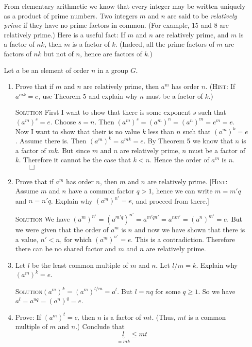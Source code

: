 \documentclass[twoside]{amsart}
\newcommand{\solution}{\textsc{Solution}\xspace}
\newcommand{\blank}{\vspace{5pt}}
\newcommand{\itm}{\blank\item}
\newcommand{\sol}{\blank\noindent\solution}
\begin{document}
\begin{enumerate}[A.]
   \noindent From elementary arithmetic we know that every integer may be
   written uniquely as a product of prime numbers. Two integers $m$ and $n$
   are said to be \emph{relatively prime} if they have no prime factors
   in common. (For example, 15 and 8 are relatively prime.) Here is a 
   useful fact: If $m$ and $n$ are relatively prime, and $m$ is a factor
   of $nk$, then $m$ is a factor of $k$. (Indeed, all the prime factors of 
   $m$ are factors of $nk$ but not of $n$, hence are factors of $k$.)

   \indent Let $a$ be an element of order $n$ in a group $G$.

   \begin{enumerate}[1)]
      \itm Prove that if $m$ and $n$ are relatively prime, then $a^m$ has
      order $n$. (\textsc{Hint}: If $a^{mk} = e$, use Theorem 5 and explain
      why $n$ must be a factor of $k$.)

      \sol First I want to show that there is some exponent $s$ such
      that $(a^m)^s = e$. Choose $s = n$. Then $(a^m)^s = (a^m)^n =
      (a^n)^m = e^m = e$. Now I want to show that their is no value $k$ 
      less than $n$ such that $(a^m)^k = e$. Assume there is. Then
      $(a^m)^k = a^{mk} = e$. By Theorem 5 we know that $n$ is a factor
      of $mk$. But since $m$ and $n$ are relatively prime, $n$ must
      be a factor of $k$. Therefore it cannot be the case that $k < n$.
      Hence the order of $a^m$ is $n$. $\qed$

      \itm Prove that if $a^m$ has order $n$, then $m$ and $n$ are relatively
      prime. [\textsc{Hint}: Assume $m$ and $n$ have a common factor $q > 1$,
      hence we can write $m = m'q$ and $n = n'q$. Explain why $(a^m)^{n'} = e$,
      and proceed from there.]

      \sol We have $(a^m)^{n'} = (a^{m'q})^{n'} = a^{m'qn'} = a^{nm'} =
      (a^n)^{m'} = e $. But we were given that the order of $a^m$ is $n$
      and now we have shown that there is a value, $n' < n$, for which
      $(a^m)^{n'} = e$. This is a contradiction. Therefore there can be no
      shared factor and $m$ and $n$ are relatively prime.

      \itm Let $l$ be the least common multiple of $m$ and $n$. Let $l/m = k$.
      Explain why $(a^m)^k = e$.

      \sol $(a^m)^k = (a^m)^{l/m} = a^l$. But $l = nq$ for some $q \ge 1$. So
      we have $a^l = a^{nq} = (a^n)^q = e$.

      \itm Prove: If $(a^m)^t = e$, then $n$ is a factor of $mt$. (Thus,
      $mt$ is a common multiple of $m$ and $n$.) Conclude that 
      \[
         \underbrace{l}_{=mk} \le mt
      \]


\end{enumerate}
\end{enumerate}
\end{document}
